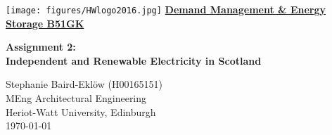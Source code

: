 \documentclass{article}
\numberwithin{equation}{section}
\numberwithin{figure}{section}
\numberwithin{table}{section}
\begin{document}
\begin{titlepage}
    \texttt{[image: figures/HWlogo2016.jpg]} %
    \centering
    \vfill
    {\bfseries\LARGE
        \textbf{\underline{Demand Management \& Energy Storage B51GK}}
    }

    {\bfseries\LARGE
        \textbf{Assignment 2:\\
        Independent and Renewable Electricity in Scotland}
    }


    \vfill
    {\Large
        Stephanie Baird-Ekl\"{o}w (H00165151)\\MEng Architectural Engineering\\
        Heriot-Watt University, Edinburgh\\
        \vspace{0.5cm}
        \today
    }
\end{titlepage}



  \newpage
  \large\tableofcontents




      \newpage
      \listoffigures
      \newpage
      \listoftables
      \newpage


  \newpage

  \newpage

  
  \newpage

  
  \newpage

  
  \newpage

  
  \newpage

  

  
\end{document}
